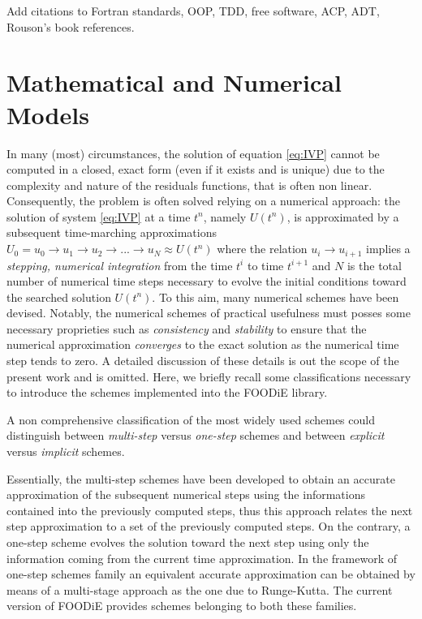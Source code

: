 \documentclass[pdftex,preprint,3p,times,numbers]{elsarticle}
\begin{document}
{\color{red} Add citations to Fortran standards, OOP, TDD, free software, ACP, ADT, Rouson's book references.}

\section{Mathematical and Numerical Models}\label{sec:MNmodels}

In many (most) circumstances, the solution of equation \ref{eq:IVP} cannot be computed in a closed, exact form (even if it exists and is unique) due to the complexity and nature of the residuals functions, that is often non linear. Consequently, the problem is often solved relying on a numerical approach: the solution of system \ref{eq:IVP} at a time $t^n$, namely $U(t^n)$, is approximated by a subsequent time-marching approximations $U_0=u_0 \rightarrow u_1 \rightarrow u_2 \rightarrow ... \rightarrow u_N\approx U(t^n)$ where the relation $u_i \rightarrow u_{i+1}$ implies a \emph{stepping, numerical integration} from the time $t^i$ to time $t^{i+1}$ and $N$ is the total number of numerical time steps necessary to evolve the initial conditions toward the searched solution $U(t^n)$. To this aim, many numerical schemes have been devised. Notably, the numerical schemes of practical usefulness must posses some necessary proprieties such as \emph{consistency} and \emph{stability} to ensure that the numerical approximation \emph{converges} to the exact solution as the numerical time step tends to zero. A detailed discussion of these details is out the scope of the present work and is omitted. Here, we briefly recall some classifications necessary to introduce the schemes implemented into the FOODiE library.

A non comprehensive classification of the most widely used schemes could distinguish between \emph{multi-step} versus \emph{one-step} schemes and between \emph{explicit} versus \emph{implicit} schemes.

Essentially, the multi-step schemes have been developed to obtain an accurate approximation of the subsequent numerical steps using the informations contained into the previously computed steps, thus this approach relates the next step approximation to a set of the previously computed steps. On the contrary, a one-step scheme evolves the solution toward the next step using only the information coming from the current time approximation. In the framework of one-step schemes family an equivalent accurate approximation can be obtained by means of a multi-stage approach as the one due to Runge-Kutta. The current version of FOODiE provides schemes belonging to both these families.
\end{document}
